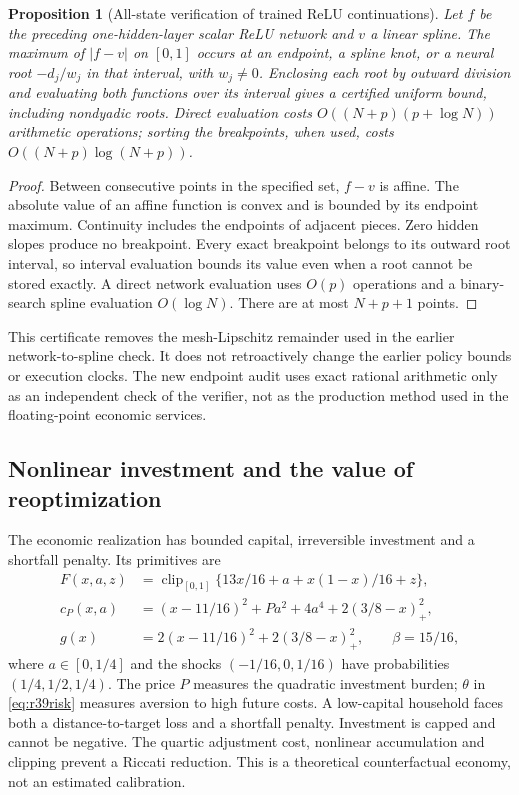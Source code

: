 \documentclass[ecta,nameyear,draft]{econsocart}
\newtheorem{proposition}[theorem]{Proposition}
\theoremstyle{definition}
\theoremstyle{remark}
\begin{document}
\begin{proposition}[All-state verification of trained ReLU continuations]
\label{prop:r39breakpoints}
Let $f$ be the preceding one-hidden-layer scalar ReLU network and $v$ a linear
spline. The maximum of $|f-v|$ on $[0,1]$ occurs at an endpoint, a spline knot,
or a neural root $-d_j/w_j$ in that interval, with $w_j\ne0$. Enclosing each
root by outward division and evaluating both functions over its interval gives
a certified uniform bound, including nondyadic roots. Direct evaluation costs
$O((N+p)(p+\log N))$ arithmetic operations; sorting the breakpoints, when used,
costs $O((N+p)\log(N+p))$.
\end{proposition}
\begin{proof}
Between consecutive points in the specified set, $f-v$ is affine. The absolute
value of an affine function is convex and is bounded by its endpoint maximum.
Continuity includes the endpoints of adjacent pieces. Zero hidden slopes
produce no breakpoint. Every exact breakpoint belongs to its outward root
interval, so interval evaluation bounds its value even when a root cannot be
stored exactly. A direct network evaluation uses $O(p)$ operations and a
binary-search spline evaluation $O(\log N)$. There are at most $N+p+1$ points.
\end{proof}

This certificate removes the mesh-Lipschitz remainder used in the earlier
network-to-spline check. It does not retroactively change the earlier policy
bounds or execution clocks. The new endpoint audit uses exact rational
arithmetic only as an independent check of the verifier, not as the production
method used in the floating-point economic services.

\subsection{Nonlinear investment and the value of reoptimization}
\label{sec:r39economy}
The economic realization has bounded capital, irreversible investment and a
shortfall penalty. Its primitives are
\begin{align}
 F(x,a,z)&=\operatorname{clip}_{[0,1]}
       \{13x/16+a+x(1-x)/16+z\},\label{eq:r39capital}\\
 c_P(x,a)&=(x-11/16)^2+Pa^2+4a^4+2(3/8-x)_+^2,\nonumber\\
 g(x)&=2(x-11/16)^2+2(3/8-x)_+^2,\qquad \beta=15/16,\nonumber
\end{align}
where $a\in[0,1/4]$ and the shocks $(-1/16,0,1/16)$ have probabilities
$(1/4,1/2,1/4)$. The price $P$ measures the quadratic investment burden;
$\theta$ in \eqref{eq:r39risk} measures aversion to high future costs.
A low-capital household faces both a distance-to-target loss and a shortfall
penalty. Investment is capped and cannot be negative. The quartic adjustment
cost, nonlinear accumulation and clipping prevent a Riccati reduction.
This is a theoretical counterfactual economy, not an estimated calibration.
\end{document}
